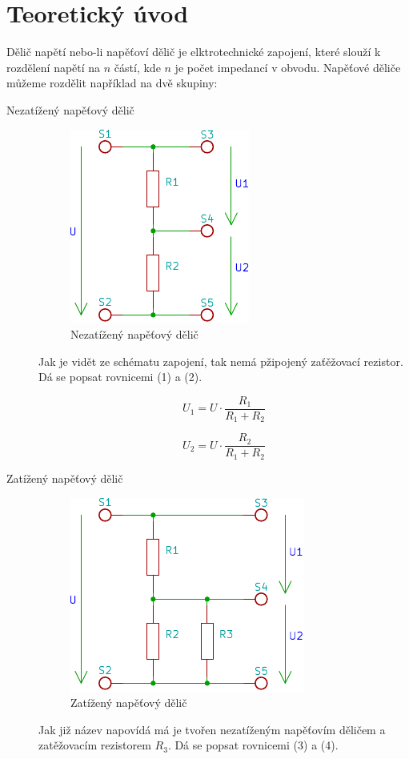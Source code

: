 \section{Teoretický úvod}
  \indent
  \indent
  Dělič napětí nebo-li napěťoví dělič je elktrotechnické zapojení, které slouží k rozdělení napětí na $n$ částí, kde $n$ je počet impedancí v obvodu. Napěťové děliče můžeme rozdělit například na dvě skupiny:
  \begin{description}
    \item[Nezatížený napěťový dělič]
      \begin{figure}[htbp]
        \centering
        \includegraphics{../ne.pdf}
        \caption{Nezatížený napěťový dělič}
        \label{sch:ne}
      \end{figure}
      Jak je vidět ze schématu zapojení, tak nemá pžipojený zaťěžovací rezistor. Dá se popsat rovnicemi (1) a (2).

      \begin{equation}
        U_1 = U \cdot \dfrac{R_1}{R_1+R_2}
      \end{equation}


      \begin{equation}
        U_2 = U \cdot \dfrac{R_2}{R_1+R_2}
      \end{equation}
    
    \item[Zatížený napěťový dělič]
      \begin{figure}[htbp]
        \centering
        \includegraphics{../za.pdf}
        \caption{Zatížený napěťový dělič}
        \label{sch:ne}
      \end{figure}
      Jak již název napovídá má je tvořen nezatíženým napěťovím děličem a zatěžovacím rezistorem $R_3$. Dá se popsat rovnicemi (3) a (4).


\end{description}
